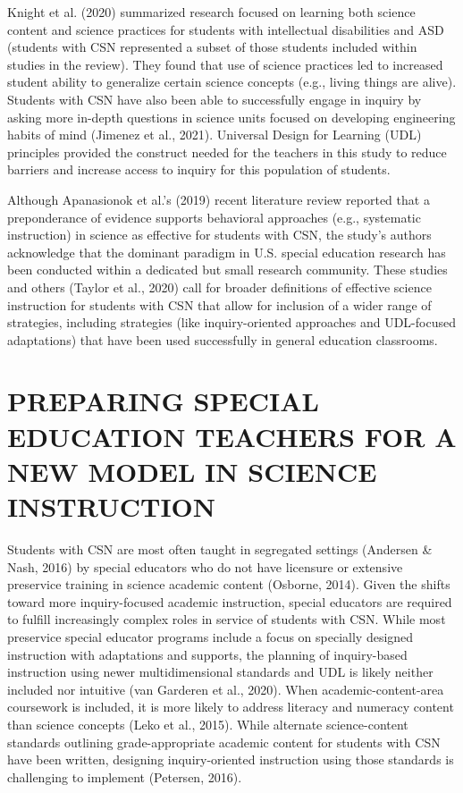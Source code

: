 \documentclass[11.5pt]{sig-alternate} %
\begin{document}
\begin{large}
Knight et al. (2020) summarized research focused on learning both science content and science practices for students with intellectual disabilities and ASD (students with CSN represented a subset of those students included within studies in the review). They found that use of science practices led to increased student ability to generalize certain science concepts (e.g., living things are alive). Students with CSN have also been able to successfully engage in inquiry by asking more in-depth questions in science units focused on developing engineering habits of mind (Jimenez et al., 2021). Universal Design for Learning (UDL) principles provided the construct needed for the teachers in this study to reduce barriers and increase access to inquiry for this population of students.

Although Apanasionok et al.’s (2019) recent literature review reported that a preponderance of evidence supports behavioral approaches (e.g., systematic instruction) in science as effective for students with CSN, the study’s authors acknowledge that the dominant paradigm in U.S. special education research has been conducted within a dedicated but small research community. These studies and others (Taylor et al., 2020) call for broader definitions of effective science instruction for students with CSN that allow for inclusion of a wider range of strategies, including strategies (like inquiry-oriented approaches and UDL-focused adaptations) that have been used successfully in general education classrooms.

\section*{PREPARING SPECIAL EDUCATION TEACHERS FOR A NEW MODEL IN SCIENCE INSTRUCTION}

Students with CSN are most often taught in segregated settings (Andersen \& Nash, 2016) by special educators who do not have licensure or extensive preservice training in science academic content (Osborne, 2014). Given the shifts toward more inquiry-focused academic instruction, special educators are required to fulfill increasingly complex roles in service of students with CSN. While most preservice special educator programs include a focus on specially designed instruction with adaptations and supports, the planning of inquiry-based instruction using newer multidimensional standards and UDL is likely neither included nor intuitive (van Garderen et al., 2020). When academic-content-area coursework is included, it is more likely to address literacy and numeracy content than science concepts (Leko et al., 2015). While alternate science-content standards outlining grade-appropriate academic content for students with CSN have been written, designing inquiry-oriented instruction using those standards is challenging to implement (Petersen, 2016).


\end{large}
\end{document}
